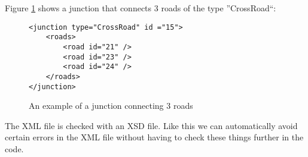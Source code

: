 Figure \ref{fig:xmlJunction} shows a junction that connects 3 roads of the type 
''CrossRoad``:

\begin{figure}[H]
\begin{lstlisting}
<junction type="CrossRoad" id ="15">
	<roads>
		<road id="21" />
		<road id="23" />
		<road id="24" />
	</roads>
</junction>
\end{lstlisting}
\caption{An example of a junction connecting 3 roads}
\label{fig:xmlJunction}
\end{figure}

The XML file is checked with an XSD file. Like this we can automatically
avoid certain errors in the XML file without having to check these
things further in the code.


